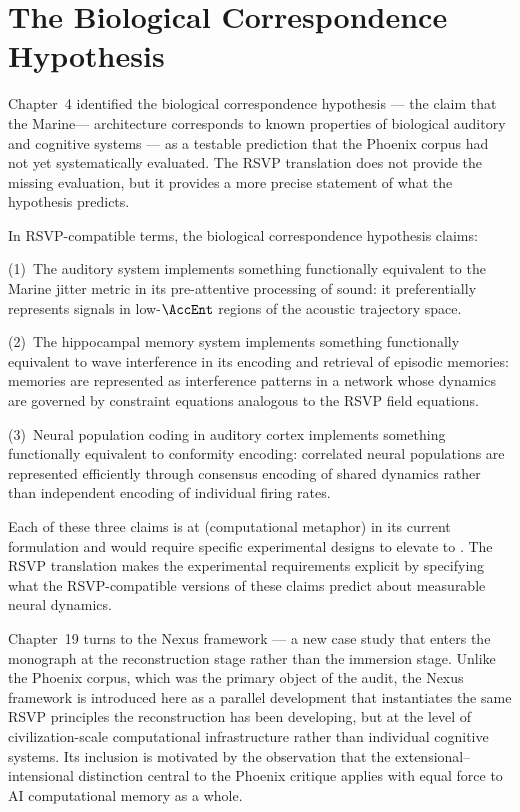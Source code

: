 \section{The Biological Correspondence Hypothesis}
\label{sec:biological-correspondence}

Chapter~4 identified the biological correspondence
hypothesis --- the claim that the Marine--\MEMeight{}--\HCFone{}
architecture corresponds to known properties of
biological auditory and cognitive systems --- as a
testable prediction that the Phoenix corpus had not
yet systematically evaluated. The RSVP translation
does not provide the missing evaluation, but it
provides a more precise statement of what the hypothesis
predicts.

In RSVP-compatible terms, the biological correspondence
hypothesis claims:

(1)~The auditory system implements something functionally
equivalent to the Marine jitter metric in its
pre-attentive processing of sound: it preferentially
represents signals in low-$\AccEnt$ regions of the
acoustic trajectory space.

(2)~The hippocampal memory system implements something
functionally equivalent to \MEMeight{} wave interference
in its encoding and retrieval of episodic memories:
memories are represented as interference patterns in
a network whose dynamics are governed by constraint
equations analogous to the RSVP field equations.

(3)~Neural population coding in auditory cortex
implements something functionally equivalent to
\HCFone{} conformity encoding: correlated neural
populations are represented efficiently through
consensus encoding of shared dynamics rather than
independent encoding of individual firing rates.

Each of these three claims is at \LevelII{} (computational
metaphor) in its current formulation and would require
specific experimental designs to elevate to \LevelI{}.
The RSVP translation makes the experimental requirements
explicit by specifying what the RSVP-compatible versions
of these claims predict about measurable neural dynamics.

\medskip

Chapter~19 turns to the Nexus framework --- a new case
study that enters the monograph at the reconstruction
stage rather than the immersion stage. Unlike the Phoenix
corpus, which was the primary object of the audit, the
Nexus framework is introduced here as a parallel development
that instantiates the same RSVP principles the reconstruction
has been developing, but at the level of civilization-scale
computational infrastructure rather than individual
cognitive systems. Its inclusion is motivated by the
observation that the extensional--intensional distinction
central to the Phoenix critique applies with equal force
to AI computational memory as a whole.
